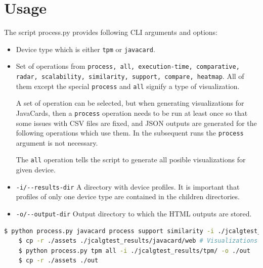 \section{Usage}
The script process.py provides following CLI arguments and options:

\begin{itemize}
    \item Device type which is either \texttt{tpm} or \texttt{javacard}.
    \item Set of operations from \texttt{process, all, execution-time, comparative, radar, scalability, similarity, support, compare, heatmap}. All of them except the special \texttt{process} and \texttt{all} signify a type of visualization.
    
    A set of operation can be selected, but when generating visualizations for JavaCards, then a \texttt{process} operation needs to be run at least once so that some issues with CSV files are fixed, and JSON outputs are generated for the following operations which use them. In the subsequent runs the \texttt{process} argument is not necessary.
    
    The \texttt{all} operation tells the script to generate all posible visualizations for given device.
    \item \texttt{-i/-{}-results-dir} A directory with device profiles. It is important that profiles of only one device type are contained in the children directories.
    \item \texttt{-o/-{}-output-dir} Output directory to which the HTML outputs are stored. 
\end{itemize}

\begin{lstlisting}[language=bash]
    $ python process.py javacard process support similarity -i ./jcalgtest_results/javacard/ -o ./jcalgtest_results/javacard/web
    $ cp -r ./assets ./jcalgtest_results/javacard/web # Visualizations need assets folder
    $ python process.py tpm all -i ./jcalgtest_results/tpm/ -o ./out
    $ cp -r ./assets ./out
\end{lstlisting}

\renewcommand{\thechapter}{B}
